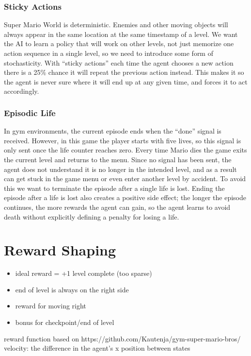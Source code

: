 \documentclass{article}
\begin{document}
\subsubsection{Sticky Actions}
Super Mario World is deterministic. 
Enemies and other moving objects will always appear in the same location at the same timestamp of a level.
We want the AI to learn a policy that will work on other levels, not just memorize one action sequence in a single level, so we need to introduce some form of stochasticity.
With ``sticky actions'' each time the agent chooses a new action there is a 25\% chance it will repeat the previous action instead.
This makes it so the agent is never sure where it will end up at any given time, and forces it to act accordingly.

\subsubsection{Episodic Life}
In gym environments, the current episode ends when the ``done'' signal is received.
However, in this game the player starts with five lives, so this signal is only sent once the life counter reaches zero.
Every time Mario dies the game exits the current level and returns to the menu.
Since no signal has been sent, the agent does not understand it is no longer in the intended level, and as a result can get stuck in the game menu or even enter another level by accident.
To avoid this we want to terminate the episode after a single life is lost.
Ending the episode after a life is lost also creates a positive side effect; the longer the episode continues, the more rewards the agent can gain, so the agent learns to avoid death without explicitly defining a penalty for losing a life.

\section{Reward Shaping}
\begin{itemize}
    \item ideal reward = +1 level complete (too sparse)
    \item end of level is always on the right side
    \item reward for moving right
    \item bonus for checkpoint/end of level
\end{itemize}
reward function based on https://github.com/Kautenja/gym-super-mario-bros/
velocity: the difference in the agent's x position between states
\end{document}
